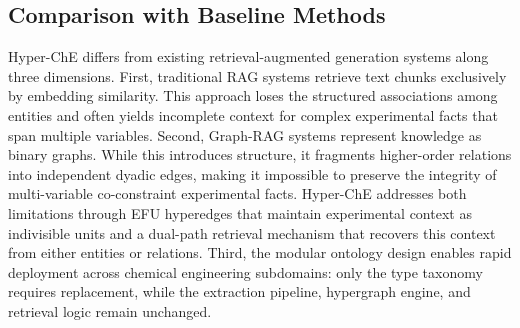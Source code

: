 \subsection{Comparison with Baseline Methods}
\label{subsec:comparison}

Hyper-ChE differs from existing retrieval-augmented generation systems along three dimensions. First, traditional RAG systems retrieve text chunks exclusively by embedding similarity. This approach loses the structured associations among entities and often yields incomplete context for complex experimental facts that span multiple variables. Second, Graph-RAG systems represent knowledge as binary graphs. While this introduces structure, it fragments higher-order relations into independent dyadic edges, making it impossible to preserve the integrity of multi-variable co-constraint experimental facts. Hyper-ChE addresses both limitations through EFU hyperedges that maintain experimental context as indivisible units and a dual-path retrieval mechanism that recovers this context from either entities or relations. Third, the modular ontology design enables rapid deployment across chemical engineering subdomains: only the type taxonomy requires replacement, while the extraction pipeline, hypergraph engine, and retrieval logic remain unchanged.
